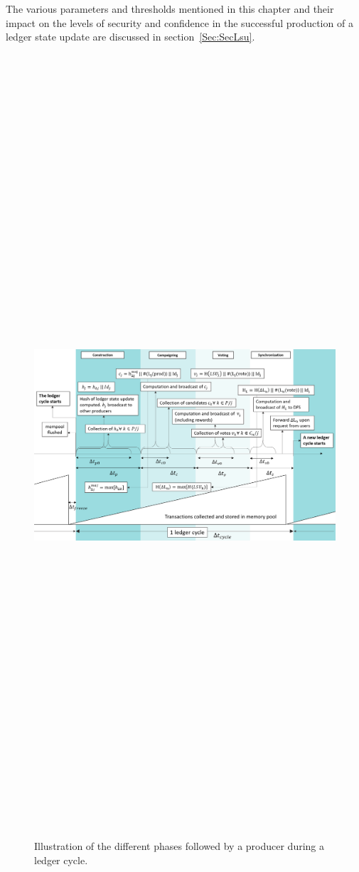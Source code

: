 The various parameters and thresholds mentioned in this chapter and their impact on the levels of security and confidence in the successful production of a ledger state update are discussed in section~\ref{Sec:SecLsu}.
\newpage
\begin{landscape}
\begin{figure}
\center
    \includegraphics[width=22cm,height=42cm,keepaspectratio]{Figures/Cat_cycle}
    \caption{\label{fig:cycle}Illustration of the different phases followed by a producer during a ledger cycle.}
\end{figure}
\end{landscape}

